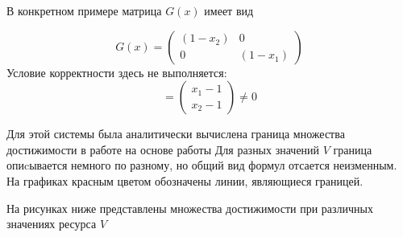 В конкретном примере матрица $G(x)$ имеет вид 

\begin{equation*}
  G(x) = 
  \begin{pmatrix}
    (1-x_2) & 0 \\
    0 & (1-x_1)
  \end{pmatrix}
\end{equation*}
Условие корректности здесь не выполняется:
\begin{equation*}
  [\varphi,\psi] = 
  \begin{pmatrix}
    x_1 - 1\\
    x_2 - 1
  \end{pmatrix}
  \neq 0
\end{equation*}


Для этой системы была аналитически вычислена граница множества
достижимости в работе на основе работы \cite{AVS2016} Для разных
значений $V$ граница опиcывается немного по разному, но общий вид
формул отсается неизменным. На графиках красным цветом обозначены
линии, являющиеся границей.

На рисунках ниже представлены множества достижимости при различных
значениях ресурса $V$

